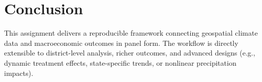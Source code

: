 \documentclass[11pt]{article}
\begin{document}
\section{Conclusion}
This assignment delivers a reproducible framework connecting geospatial climate data and
macroeconomic outcomes in panel form. The workflow is directly extensible to district-level
analysis, richer outcomes, and advanced designs (e.g., dynamic treatment effects, state-specific
trends, or nonlinear precipitation impacts).
\end{document}
